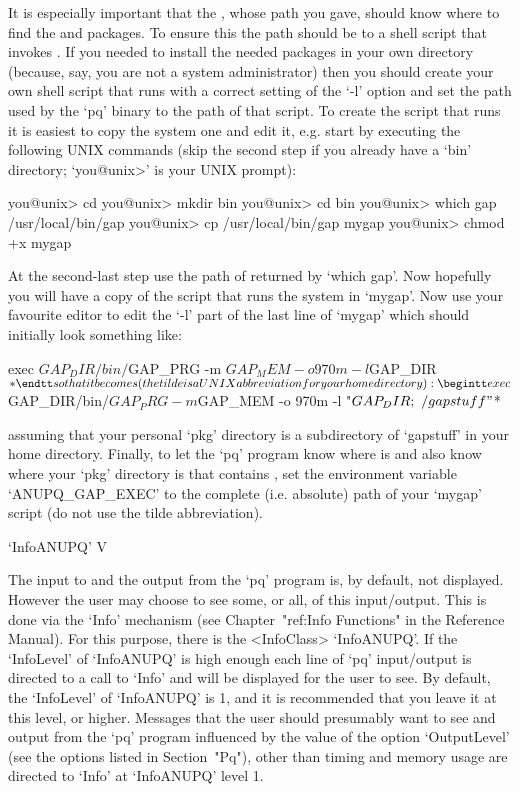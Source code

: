 It is especially important that the {\GAP}, whose path you  gave,  should
know where to find the {\ANUPQ} and {\AutPGrp} packages. To  ensure  this
the path should be to a shell script that invokes {\GAP}. If  you  needed
to install the needed packages in your own directory (because,  say,  you
are not a system administrator) then you should  create  your  own  shell
script that runs {\GAP} with a correct setting of the `-l' option and set
the path used by the `pq' binary to the path of that  script.  To  create
the script that runs {\GAP} it is easiest to copy the system one and edit
it, e.g. start by executing the following UNIX commands (skip the  second
step if you already have a `bin'  directory;  `you@unix>'  is  your  UNIX
prompt):

\begintt
you@unix> cd
you@unix> mkdir bin
you@unix> cd bin
you@unix> which gap
/usr/local/bin/gap
you@unix> cp /usr/local/bin/gap mygap
you@unix> chmod +x mygap
\endtt

At the second-last step use the path of {\GAP} returned by  `which  gap'.
Now hopefully you will have a copy of the script  that  runs  the  system
{\GAP} in `mygap'. Now use your favourite editor to edit the `-l' part of
the last line of `mygap' which should initially look something like:

\begintt
exec $GAP_DIR/bin/$GAP_PRG -m $GAP_MEM -o 970m -l $GAP_DIR $*
\endtt

so that it becomes (the tilde  is  a  UNIX  abbreviation  for  your  home
directory):

\begintt
exec $GAP_DIR/bin/$GAP_PRG -m $GAP_MEM -o 970m -l "$GAP_DIR;~/gapstuff" $*
\endtt

assuming that your personal {\GAP} `pkg' directory is a  subdirectory  of
`gapstuff' in your home directory. Finally, to let the `pq' program  know
where {\GAP} is and also know where your `pkg' directory is that contains
{\ANUPQ}, set the environment variable `ANUPQ_GAP_EXEC' to  the  complete
(i.e. absolute) path of  your  `mygap'  script  (do  not  use  the  tilde
abbreviation).


\>`InfoANUPQ' V

The input to and the output from the `pq' program  is,  by  default,  not
displayed. However the user may choose to  see  some,  or  all,  of  this
input/output.   This   is   done   via   the   `Info'   mechanism    (see
Chapter~"ref:Info Functions" in the {\GAP} Reference  Manual).  For  this
purpose, there is the <InfoClass>  `InfoANUPQ'.  If  the  `InfoLevel'  of
`InfoANUPQ' is high enough each line of `pq' input/output is directed  to
a call to `Info' and will be displayed for the user to see.  By  default,
the `InfoLevel' of `InfoANUPQ' is 1, and it is recommended that you leave
it at this level, or higher. Messages that  the  user  should  presumably
want to see and output from the `pq' program influenced by the  value  of
the option `OutputLevel' (see the options listed in Section~"Pq"),  other
than timing and memory usage are directed to `Info' at `InfoANUPQ'  level
1.

